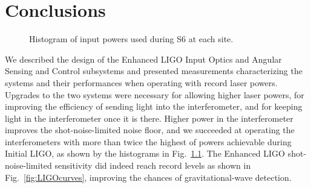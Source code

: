 \chapter{Conclusions}

\begin{figure}
\begin{centering}
\caption[Histogram of input powers used during S6]{Histogram of input
  powers used during S6 at each site.}
\label{fig:S6pwrs}
\end{centering}
\end{figure}

We described the design of the Enhanced LIGO Input Optics and Angular
Sensing and Control subsystems and presented measurements
characterizing the systems and their performances when operating with
record laser powers. Upgrades to the two systems were necessary for
allowing higher laser powers, for improving the efficiency of sending
light into the interferometer, and for keeping light in the
interferometer once it is there. Higher power in the interferometer
improves the shot-noise-limited noise floor, and we succeeded at
operating the interferometers with more than twice the highest of
powers achievable during Initial LIGO, as shown by the histograms in
Fig.~\ref{fig:S6pwrs}. The Enhanced LIGO shot-noise-limited
sensitivity did indeed reach record levels as shown in
Fig.~\ref{fig:LIGOcurves}, improving the chances of gravitational-wave
detection.


